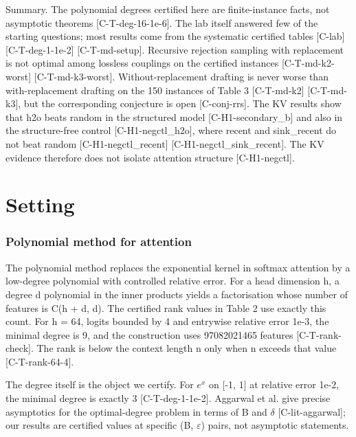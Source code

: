 \documentclass[10pt,twocolumn]{article}
\begin{document}
Summary. The polynomial degrees certified here are finite-instance facts, not asymptotic theorems {\scriptsize[C-T-deg-16-1e-6]}. The lab itself answered few of the starting questions; most results come from the systematic certified tables {\scriptsize[C-lab]} {\scriptsize[C-T-deg-1-1e-2]} {\scriptsize[C-T-md-setup]}. Recursive rejection sampling with replacement is not optimal among lossless couplings on the certified instances {\scriptsize[C-T-md-k2-worst]} {\scriptsize[C-T-md-k3-worst]}. Without-replacement drafting is never worse than with-replacement drafting on the 150 instances of Table 3 {\scriptsize[C-T-md-k2]} {\scriptsize[C-T-md-k3]}, but the corresponding conjecture is open {\scriptsize[C-conj-rrs]}. The KV results show that h2o beats random in the structured model {\scriptsize[C-H1-secondary\_b]} and also in the structure-free control {\scriptsize[C-H1-negctl\_h2o]}, where recent and sink\_recent do not beat random {\scriptsize[C-H1-negctl\_recent]} {\scriptsize[C-H1-negctl\_sink\_recent]}. The KV evidence therefore does not isolate attention structure {\scriptsize[C-H1-negctl]}.

\section{Setting}

\subsubsection*{Polynomial method for attention}

The polynomial method replaces the exponential kernel in softmax attention by a low-degree polynomial with controlled relative error. For a head dimension h, a degree d polynomial in the inner products yields a factorisation whose number of features is C(h + d, d). The certified rank values in Table 2 use exactly this count. For h = 64, logits bounded by 4 and entrywise relative error 1e-3, the minimal degree is 9, and the construction uses 97082021465 features {\scriptsize[C-T-rank-check]}. The rank is below the context length n only when n exceeds that value {\scriptsize[C-T-rank-64-4]}.

The degree itself is the object we certify. For $e^x$ on [-1, 1] at relative error 1e-2, the minimal degree is exactly 3 {\scriptsize[C-T-deg-1-1e-2]}. Aggarwal et al. give precise asymptotics for the optimal-degree problem in terms of B and $\delta$ {\scriptsize[C-lit-aggarwal]}; our results are certified values at specific (B, $\varepsilon$) pairs, not asymptotic statements.
\end{document}
